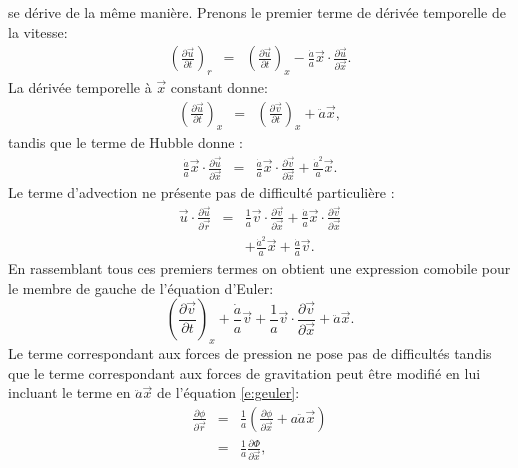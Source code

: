    se dérive de la même manière. Prenons le premier terme de dérivée temporelle de la vitesse:
 \begin{eqnarray}
 \left(\frac{\partial \vec u}{\partial t}\right)_r&=&\left(\frac{\partial \vec u}{\partial t}\right)_x-\frac{\dot a }{a}\vec x \cdot \frac{\partial \vec u}{\partial \vec x}.
\end{eqnarray}  
La dérivée temporelle à $\vec x$ constant donne:
\begin{eqnarray}
\left(\frac{\partial \vec u}{\partial t}\right)_x&=&\left(\frac{\partial \vec v}{\partial t}\right)_x + \ddot a {\vec x},
\end{eqnarray}
tandis que le terme de Hubble donne :
\begin{eqnarray}
\frac{\dot a }{a}\vec x \cdot \frac{\partial \vec u}{\partial \vec x}&=&\frac{\dot a }{a}\vec x \cdot \frac{\partial \vec v}{\partial \vec x}+\frac{\dot a^2}{a}\vec x.
\end{eqnarray}
 Le terme d'advection ne présente pas de difficulté particulière  :
 \begin{eqnarray}
 \vec u \cdot \frac{\partial \vec u}{\partial \vec r}&=&\frac{1}{a}\vec v \cdot \frac{\partial \vec v}{\partial \vec x}+\frac{\dot a}{a}\vec x \cdot \frac{\partial \vec v}{\partial \vec x}\\
 &&+ \frac{\dot a^2}{a}\vec x +\frac{\dot a}{a}\vec v.
 \end{eqnarray}
 En rassemblant tous ces premiers termes on obtient une expression comobile pour le membre de gauche de l'équation d'Euler:
 \begin{equation}
 \left(\frac{\partial \vec v}{\partial t}\right)_x +\frac{\dot a}{a}\vec v+\frac{1}{a}\vec v \cdot \frac{\partial \vec v}{\partial \vec x} + \ddot a {\vec x}. 
 \label{e:geuler}
 \end{equation}
 Le terme correspondant aux forces de pression ne pose pas de difficultés tandis que le terme correspondant aux forces de gravitation peut être modifié en lui incluant le terme en $\ddot a {\vec x}$ de l'équation \ref{e:geuler}:
 \begin{eqnarray}
  \frac{\partial \phi}{\partial \vec r}&=&\frac{1}{a}(\frac{\partial \phi}{\partial \vec x}+a\ddot a \vec x)\\
  &=&\frac{1}{a}\frac{\partial \Phi}{\partial \vec x},
 \end{eqnarray}
